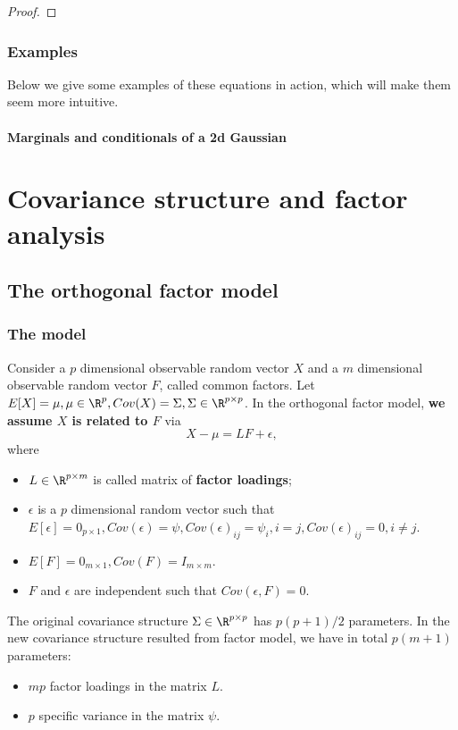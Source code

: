 \begin{refsection}
\begin{proof}
\end{proof}

\subsubsection{Examples}
Below we give some examples of these equations in action, which will make them seem more intuitive.


\paragraph{Marginals and conditionals of a 2d Gaussian}



\section{Covariance structure and factor analysis}\label{ch:statistical-models:sec:FactorAnalysis}
\subsection{The orthogonal factor model}
\subsubsection{The model}
\begin{definition}\cite[482]{johnson2007applied}
Consider a $p$ dimensional observable random vector $X$ and a $m$ dimensional observable random vector $F$, called common factors. Let $E[X] = \mu, \mu\in \R^p, Cov(X) = \Sigma,\Sigma\in\R^{p\times p}$. 
In the orthogonal factor model, \textbf{we assume $X$ is related to $F$} via
$$X - \mu = L F + \epsilon,$$
where 
\begin{itemize}
	\item $L\in \R^{p\times m}$ is called matrix of \textbf{factor loadings};
	\item $\epsilon$ is a $p$ dimensional random vector such that $E[\epsilon] = 0_{p\times 1}, Cov(\epsilon) = \psi, Cov(\epsilon)_{ij} = \psi_{i}, i = j, Cov(\epsilon)_{ij} = 0, i\neq j$.
	\item $E[F] = 0_{m\times 1}, Cov(F) = I_{m\times m}.$
	\item $F$ and $\epsilon$ are independent such that $Cov(\epsilon, F) = 0$.
\end{itemize}
\end{definition}


\begin{remark}
The original covariance structure $\Sigma\in \R^{p\times p}$ has $p(p+1)/2$ parameters. In the new covariance structure resulted from factor model, we have in total $p(m+1)$ parameters:
\begin{itemize}
	\item $mp$ factor loadings in the matrix $L$.
	\item $p$ specific variance in the matrix $\psi$.
\end{itemize} 	
\end{remark}



\end{refsection}
